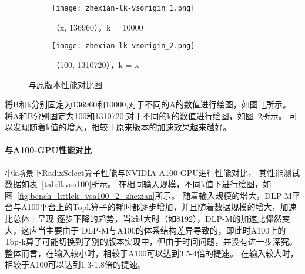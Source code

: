     \begin{figure}[htbp]
        \centering
        
        \begin{subfigure}[b]{\textwidth}
            \centering
            \texttt{[image: zhexian-lk-vsorigin\_1.png]}
            \caption{（x, 136960），k = 10000}
            \label{fig:bench_littlek-vsorigin}
        \end{subfigure}
    
        \vspace{0em} %
    
        \begin{subfigure}[b]{\textwidth}
            \centering
            \texttt{[image: zhexian-lk-vsorigin\_2.png]}
        \caption{（100, 1310720），k = x}
        \label{fig:bench_littlek-vsorigin_1}
        \end{subfigure}
    
        \caption{与原版本性能对比图}
        \label{fig:bench_littlek-vsorigin_0}
    \end{figure}

    将B和k分别固定为136960和10000,对于不同的A的数值进行绘图，如图~\ref{fig:bench_littlek-vsorigin}所示。
    将A和B分别固定为100和1310720,对于不同的k的数值进行绘图，如图~\ref{fig:bench_littlek-vsorigin_1}所示。
    可以发现随着k值的增大，相较于原来版本的加速效果越来越好。


    

\paragraph{与A100-GPU性能对比}
小k场景下RadixSelect算子性能与NVIDIA A100 GPU进行性能对比，
其性能测试数据如表~\ref{tab:lkvsa100}所示。
在相同输入规模，不同k值下进行绘图，如图~\ref{fig:bench_littlek_vsa100_2_zhexian}所示。
随着输入规模的增大，DLP-M平台与A100平台上的Topk算子的耗时都逐步增加，并且随着数据规模的增大，加速比总体上呈现
逐步下降的趋势，当k过大时（如8192），DLP-M的加速比骤然变大，这应当主要由于
DLP-M与A100的体系结构差异导致的，即此时A100上的Top-k算子可能切换到了别的版本实现中，但由于时间问题，并没有进一步深究。
整体而言，在输入较小时，相较于A100可以达到3.5-4倍的提速。
在输入较大时，相较于A100可以达到1.3-1.8倍的提速。

